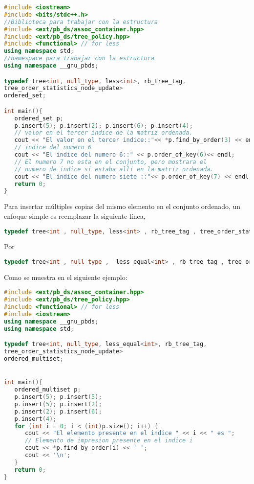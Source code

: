 \begin{lstlisting}[language=C++]
#include <iostream>
#include <bits/stdc++.h>
//Biblioteca para trabajar con la estructura
#include <ext/pb_ds/assoc_container.hpp>
#include <ext/pb_ds/tree_policy.hpp>
#include <functional> // for less
using namespace std;
//namespace para trabajar con la estructura
using namespace __gnu_pbds;

typedef tree<int, null_type, less<int>, rb_tree_tag,
tree_order_statistics_node_update>
ordered_set;

int main(){
   ordered_set p;
   p.insert(5); p.insert(2); p.insert(6); p.insert(4);
   // valor en el tercer indice de la matriz ordenada.
   cout << "El valor en el tercer indice::"<< *p.find_by_order(3) << endl;
   // indice del numero 6
   cout << "El indice del numero 6::" << p.order_of_key(6)<< endl;
   // El numero 7 no esta en el conjunto, pero mostrara el
   // numero de indice si estaba alli en la matriz ordenada.
   cout << "El indice del numero siete ::"<< p.order_of_key(7) << endl;
   return 0;
}
\end{lstlisting}

Para insertar múltiples copias del mismo elemento en el conjunto ordenado, un enfoque simple es reemplazar la siguiente línea,

\begin{lstlisting}[language=C++]
typedef tree<int , null_type, less<int> , rb_tree_tag , tree_order_statistics_node_update> ordered_set;
\end{lstlisting}

Por

\begin{lstlisting}[language=C++]
typedef tree<int , null_type ,  less_equal<int> , rb_tree_tag , tree_order_statistics_node_update> ordered_multiset
\end{lstlisting}

Como se muestra en el siguiente ejemplo:

\begin{lstlisting}[language=C++]
#include <ext/pb_ds/assoc_container.hpp>
#include <ext/pb_ds/tree_policy.hpp>
#include <functional> // for less
#include <iostream>
using namespace __gnu_pbds;
using namespace std;

typedef tree<int, null_type, less_equal<int>, rb_tree_tag,
tree_order_statistics_node_update>
ordered_multiset;


int main(){
   ordered_multiset p;
   p.insert(5); p.insert(5);
   p.insert(5); p.insert(2);
   p.insert(2); p.insert(6);
   p.insert(4);
   for (int i = 0; i < (int)p.size(); i++) {
      cout << "El elemento presente en el indice " << i << " es ";
      // Elemento de impresion presente en el indice i
      cout << *p.find_by_order(i) << ' ';
      cout << '\n';
   }
   return 0;
}
\end{lstlisting}


